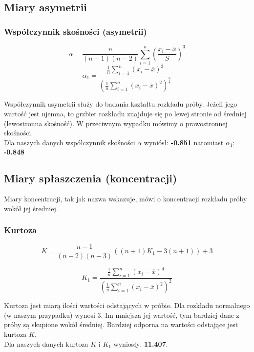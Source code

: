 \documentclass{article}
\theoremstyle{break}
\begin{document}
	\subsection{Miary asymetrii}
	\subsubsection*{Współczynnik skośności (asymetrii)}
	
	$$\alpha =\frac{n}{(n-1)(n-2)}\sum\limits_{i=1}^{n}(\frac{x_i-\overline{x}}{S})^3$$
	$$\alpha_1 =\frac{\frac{1}{n}\sum\limits_{i=1}^{n}(x_i-\overline{x})^3}{(\frac{1}{n}\sum\limits_{i=1}^{n}(x_i-\overline{x})^2)^{\frac{3}{2}}}$$
	
	Współczynnik asymetrii służy do badania kształtu rozkładu próby. Jeżeli jego wartość jest ujemna, to grzbiet rozkładu znajduje się po lewej stronie od średniej (lewostronna skośność). W przeciwnym wypadku mówimy o prawostronnej skośności. 
	\\Dla naszych danych współczynnik skośności $\alpha$ wyniósł: \textbf{-0.851} natomiast $\alpha_1$: \textbf{-0.848}
	
	\subsection{Miary spłaszczenia (koncentracji)}
	
	Miary koncentracji, tak jak nazwa wskazuje, mówi o koncentracji rozkładu próby wokół jej średniej.
	
	\subsubsection*{Kurtoza}
	
	$$K=\frac{n-1}{(n-2)(n-3)}((n+1)K_1-3(n+1))+3$$

	$$K_1 =\frac{\frac{1}{n}\sum\limits_{i=1}^{n}(x_i-\overline{x})^4}{(\frac{1}{n}\sum\limits_{i=1}^{n}(x_i-\overline{x})^2)^2}$$
	
	Kurtoza jest miarą ilości wartości odstających w próbie. Dla rozkładu normalnego (w naszym przypadku) wynosi 3. Im mniejsza jej wartość, tym bardziej dane z próby są skupione wokół średniej. Bardziej odporna na wartości odstające jest kurtoza $K$.
	\\Dla naszych danych kurtoza $K$ i $K_1$ wyniosły: \textbf{11.407}.
	
\end{document}
